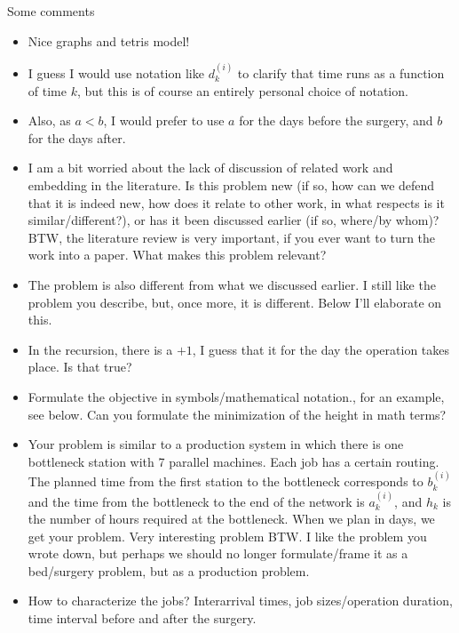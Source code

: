\documentclass{article}
\begin{document}
Some comments

\begin{itemize}
\item Nice graphs and tetris model!
\item I guess I would use notation like $d_k^{(i)}$ to clarify that time runs as a function of time $k$, but this is of course an entirely personal choice of notation.
\item Also, as $a<b$, I would prefer to use $a$ for the days before the surgery, and $b$ for the days after. 
\item I am a bit worried about the lack of discussion of related work and  embedding in the literature. Is this   problem new (if so, how can we defend that it is indeed new, how does it relate to other work, in what respects is it similar/different?), or has it been discussed earlier (if so, where/by whom)? BTW, the literature review is very important, if you ever want to turn the work into a paper. What makes this problem relevant? 
\item The problem is also different from what we discussed earlier. I still like the problem you describe, but, once more, it is different. Below I'll elaborate on this. 
\item In the recursion, there is a $+1$, I guess that it for the day the operation takes place. Is that true?
\item Formulate the objective in symbols/mathematical notation., for an example, see below. Can you formulate the minimization of the height in math terms?
\item Your problem is similar to a production system in which there is one bottleneck station with 7 parallel machines. Each job has a certain routing. The planned time from the first station to the bottleneck corresponds to $b^{(i)}_k$ and  the time  from the bottleneck to the end of the network is $a_{k}^{(i)}$, and $h_k$ is the number of hours required at the bottleneck. When we plan in days, we get your problem. Very interesting problem BTW.  I like the problem you wrote down, but perhaps we should no longer formulate/frame it as a bed/surgery problem, but as a production problem.
\item How to characterize the jobs? Interarrival times, job sizes/operation duration, time interval before and after the surgery.
\end{itemize}
\end{document}
